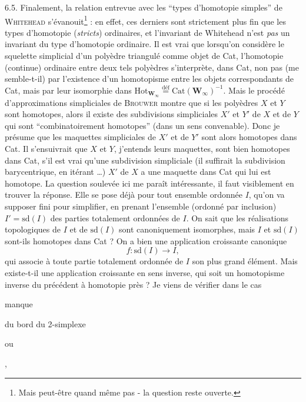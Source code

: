 6.5. Finalement, la relation entrevue avec les “types d'homotopie simples” de \textsc{Whitehead} s'évanouit\footnote[44]{Mais peut-être quand même pas - la question reste ouverte.} : en effet, ces derniers sont strictement plus fin que les types d'homotopie (\textit{stricts}) ordinaires, et l'invariant de Whitehead n'est \textit{pas} un invariant du type d'homotopie ordinaire. Il est vrai que lorsqu'on considère le squelette simplicial d'un polyèdre triangulé comme objet de Cat, l'homotopie (continue) ordinaire entre deux tels polyèdres s'interprète, dans Cat, non pas (me semble-t-il) par l'existence d'un homotopisme entre les objets correspondants de Cat, mais par leur isomorphie dans $\mathrm{Hot}_{\mathbf{W}_\infty} \overset{\text{déf}}{=} \mathrm{Cat}(\mathbf{W}_\infty)^{-1}$. Mais le procédé d'approximations simpliciales de \textsc{Brouwer} montre que si les polyèdres $X$ et $Y$ sont homotopes, alors il existe des subdivisions simpliciales $X'$ et $Y'$ de $X$ et de $Y$ qui sont “combinatoirement homotopes” (dans un sens convenable). Donc je présume que les maquettes simpliciales de $X'$ et de $Y'$ sont alors homotopes dans Cat. Il s'ensuivrait que %
$X$ et $Y$, j'entends leurs maquettes, sont bien homotopes dans Cat, s'il est vrai qu'une subdivision simpliciale (il suffirait la subdivision barycentrique, en itérant \ldots) $X'$ de $X$ a une maquette dans Cat qui lui est homotope. La question soulevée ici me paraît intéressante, il faut visiblement en trouver la réponse. Elle se pose déjà pour tout ensemble ordonnée $I$, qu'on va supposer fini pour simplifier, en prenant l'ensemble (ordonné par inclusion) $I' = \mathrm{sd}(I)$ des parties totalement ordonnées de $I$. On sait que les réalisations topologiques de $I$ et de $\mathrm{sd}(I)$ sont canoniquement isomorphes, mais $I$ et $\mathrm{sd}(I)$ sont-ils homotopes dans Cat ? On a bien une application croissante canonique %
\[ f : \mathrm{sd}(I) \longrightarrow I, \]
qui associe à toute partie totalement ordonnée de $I$ son plus grand élément. Mais existe-t-il une application croissante en sens inverse, qui soit un homotopisme inverse du précédent à homotopie près ? Je viens de vérifier dans le cas

 manque

du bord du 2-simplexe

\begin{center}
\qquad\qquad\qquad ou \qquad\qquad\qquad
{}
\qquad\quad ,
\end{center}

